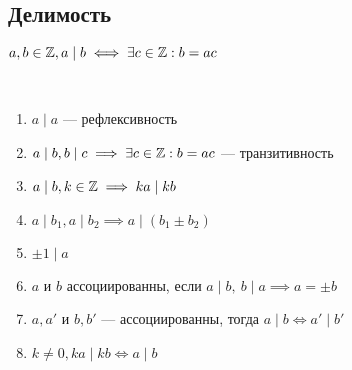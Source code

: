 \subsection{Делимость}

\begin{defn}
    $a, b \in \mathbb{Z}, a \mid b \iff \exists c \in \mathbb{Z}: b = ac$
\end{defn}

\begin{prop}~

    \begin{enumerate}
        \item $a \mid a$ --- рефлексивность
        
        \item $a \mid b, b \mid c \implies \exists c \in \mathbb{Z}: b = ac$ --- транзитивность
        
        \item $a \mid b, k \in \mathbb{Z} \implies ka \mid kb$ 
        
        \item $a \mid b_1, a \mid b_2 \implies a \mid (b_1 \pm b_2)$
        
        \item $\pm1 \mid a$
        
        \item $a$ и $b$ ассоциированны, если $a \mid b,~b \mid a \implies a = \pm b$
        
        \item $a, a'$ и $b, b'$ --- ассоциированны, тогда $a \mid b \iff a' \mid b'$
        
        \item $k \neq 0, ka \mid kb \iff a \mid b$
    \end{enumerate}
\end{prop}